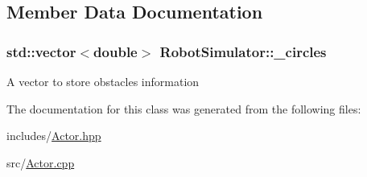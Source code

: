 \subsection{Member Data Documentation}
\hypertarget{classRobotSimulator_a3ce83e536763d1892fb099ba110be183}{
\subsubsection[{\-\_\-circles}]{\setlength{\rightskip}{0pt plus 5cm}std\-::vector$<$double$>$ Robot\-Simulator\-::\-\_\-circles}}\label{classRobotSimulator_a3ce83e536763d1892fb099ba110be183}
A vector to store obstacles information 

The documentation for this class was generated from the following files\-:\begin{DoxyCompactItemize}
\item 
includes/\hyperlink{Actor_8hpp}{Actor.\-hpp}\item 
src/\hyperlink{Actor_8cpp}{Actor.\-cpp}\end{DoxyCompactItemize}
